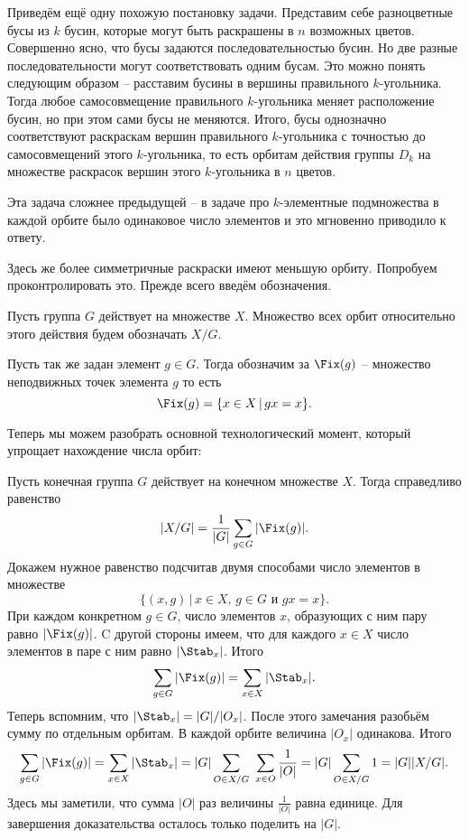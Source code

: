 Приведём ещё одну похожую постановку задачи. Представим себе разноцветные бусы из $k$ бусин, которые могут быть раскрашены в $n$ возможных цветов. Совершенно ясно, что бусы задаются последовательностью бусин. Но две разные последовательности могут соответствовать одним бусам. Это можно понять следующим образом -- расставим бусины в вершины правильного $k$-угольника. Тогда любое самосовмещение правильного $k$-угольника меняет расположение бусин, но при этом сами бусы не меняются. Итого,  бусы однозначно соответствуют раскраскам вершин правильного $k$-угольника с точностью до самосовмещений этого $k$-угольника, то есть орбитам действия группы $D_k$ на множестве раскрасок вершин этого $k$-угольника в  $n$ цветов.

Эта задача сложнее предыдущей -- в задаче про $k$-элементные подмножества в каждой орбите было одинаковое число элементов и это мгновенно приводило к ответу. 

Здесь же более симметричные раскраски имеют меньшую орбиту. Попробуем проконтролировать это. Прежде всего введём обозначения.

\dfn Пусть группа $G$ действует на множестве $X$. Множество всех орбит относительно этого действия будем обозначать $X/G$.
\edfn 

\dfn Пусть так же задан элемент $g\in G$. Тогда обозначим за $\Fix(g)$ -- множество неподвижных точек элемента $g$ то есть 
$$\Fix(g)=\{x \in X\,|\, gx=x\}.$$
\edfn

Теперь мы можем разобрать основной технологический момент, который упрощает нахождение числа орбит:

Пусть конечная группа $G$ действует на конечном множестве $X$. Тогда справедливо равенство
$$|X/G|=\frac{1}{|G|}\sum_{g\in G}|\Fix(g)|.$$
\ethrm
\proof Докажем нужное равенство подсчитав двумя способами число элементов в множестве $$\{(x,g) \,|\, x\in X,\, g\in G \text{ и } gx=x\}.$$
При каждом конкретном $g\in G$, число элементов $x$, образующих с ним пару равно $|\Fix(g)|$. C другой стороны имеем, что для каждого $x\in X$ число элементов в паре с ним равно $|\Stab_x|$. Итого $$\sum_{g\in G}|\Fix(g)|= \sum_{x\in X} |\Stab_x|.$$
Теперь вспомним, что $|\Stab_x|=|G|/|O_x|$. После этого замечания разобьём сумму по отдельным орбитам. В каждой орбите величина $|O_x|$ одинакова. Итого 
$$\sum_{g\in G}|\Fix(g)|= \sum_{x\in X} |\Stab_x|= |G|\sum_{O\in X/G}\,\, \sum_{x\in O} \frac{1}{|O|}=|G|\sum_{O\in X/G} 1=|G||X/G|.$$
Здесь мы заметили, что сумма $|O|$ раз величины $\frac{1}{|O|}$ равна единице. Для завершения доказательства осталось только поделить на $|G|$.
\endproof

